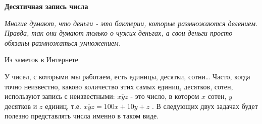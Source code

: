 \newpage

\begin{center}
	{\large\textbf{Десятичная запись числа}}
\end{center}

\epigraph{\textit{Многие думают, что деньги - это бактерии, которые размножаются делением. Правда, так они думают только о чужих деньгах, а свои деньги просто обязаны размножаться умножением.}}{Из заметок в Интернете}

У чисел, с которыми мы работаем, есть единицы, десятки, сотни… Часто, когда точно неизвестно, каково количество этих самых единиц, десятков, сотен, используют запись с неизвестными: $\overline{xyz}$ - это число, в котором $x$ сотен, $y$ десятков и $z$ единиц, т.е. $\overline{xyz} = 100x + 10y + z$ . В следующих двух  задачах будет полезно представлять числа именно в таком виде. 


